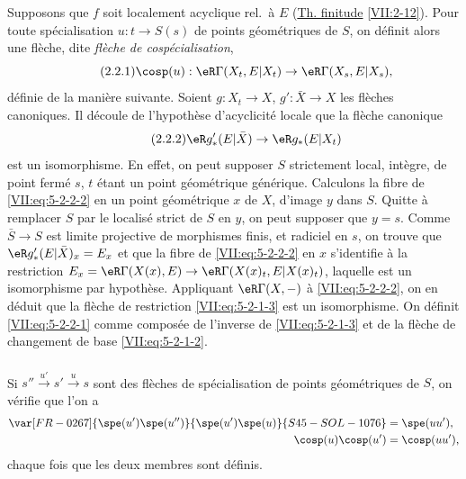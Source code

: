 Supposons que $f$ soit localement acyclique rel.\ à $E$ (\hyperref[VII]{Th. finitude} \ref{VII:2-12}). 
Pour toute spécialisation $u:t\to S(s)$ de points géométriques de $S$, on 
définit alors une flèche, dite \emph{flèche de cospécialisation}, 
\begin{equation*}\tag{2.2.1}\label{VII:eq:5-2-2-1}
  \cosp(u):\eR\Gamma(X_t,E|X_t) \to \eR\Gamma(X_s,E|X_s) \text{,} 
\end{equation*}
définie de la manière suivante. Soient $g:X_t\to X$, $g':\bar X\to X$ les 
flèches canoniques. Il découle de l'hypothèse d'acyclicité locale que 
la flèche canonique 
\begin{equation*}\tag{2.2.2}\label{VII:eq:5-2-2-2}
  \eR g_\ast'(E|\bar X)\to \eR g_\ast(E|X_t) 
\end{equation*}
est un isomorphisme. En effet, on peut supposer $S$ strictement local, 
intègre, de point fermé $s$, $t$ étant un point géométrique 
générique. Calculons la fibre de \eqref{VII:eq:5-2-2-2} en un point 
géométrique $x$ de $X$, d'image $y$ dans $S$. Quitte à remplacer $S$ par 
le localisé strict de $S$ en $y$, on peut supposer que $y=s$. Comme 
$\bar S\to S$ est limite projective de morphismes finis, et radiciel en $s$, on 
trouve que $\eR g_\ast'(E|\bar X)_x = E_x$ et que la fibre de 
\eqref{VII:eq:5-2-2-2} en $x$ s'identifie à la restriction 
$E_x=\eR\Gamma(X(x),E)\to \eR\Gamma(X(x)_t,E|X(x)_t)$, laquelle est un 
isomorphisme par hypothèse. Appliquant $\eR\Gamma(X,-)$ à 
\eqref{VII:eq:5-2-2-2}, on en déduit que la flèche de restriction 
\eqref{VII:eq:5-2-1-3} est un isomorphisme. On définit \eqref{VII:eq:5-2-2-1} 
comme composée de l'inverse de \eqref{VII:eq:5-2-1-3} et de la flèche de 
changement de base \eqref{VII:eq:5-2-1-2}. 





\subsubsection{}\label{VII:5-2-3}

Si $s'' \xrightarrow{u'} s' \xrightarrow u s$ sont des flèches de 
spécialisation de points géométriques de $S$, on vérifie que l'on a 
\begin{align*}
  \var[FR-0267]{\spe(u')\spe(u'')}{\spe(u')\spe(u)}{S45-SOL-1076} &= \spe(u u') \text{,} \\
  \cosp(u) \cosp(u') &= \cosp(u u') \text{,} 
\end{align*}
chaque fois que les deux membres sont définis. 





